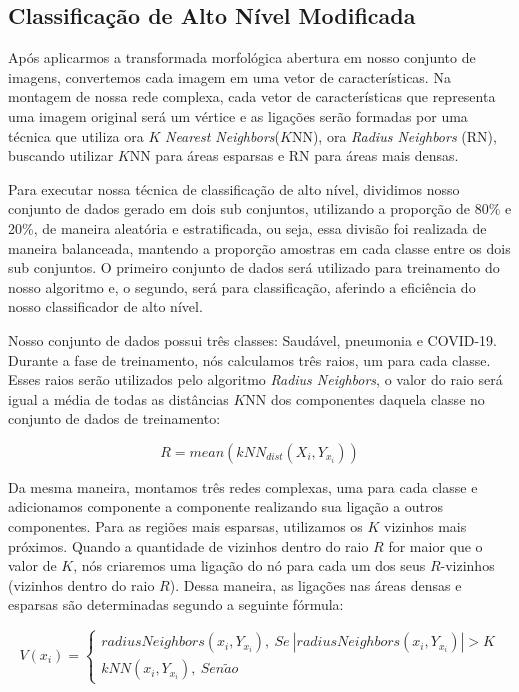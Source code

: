 \documentclass[
12pt,        %
oneside,     %
a4paper,     %
english,       %
brazil        %
%
%
]{ppgca}
\begin{document}
\subsection{Classificação de Alto Nível Modificada}
Após aplicarmos a transformada morfológica abertura em nosso conjunto de imagens, convertemos cada imagem em uma vetor de características. Na montagem de nossa rede complexa, cada vetor de características que representa uma imagem original será um vértice e as ligações serão formadas por uma técnica que utiliza ora $K$ \textit{Nearest Neighbors}($K$NN), ora \textit{Radius Neighbors} (RN), buscando utilizar $K$NN para áreas esparsas e RN para áreas mais densas.

Para executar nossa técnica de classificação de alto nível, dividimos nosso conjunto de dados gerado em dois sub conjuntos, utilizando a proporção de 80\% e 20\%, de maneira aleatória e estratificada, ou seja, essa divisão foi realizada de maneira balanceada, mantendo a proporção amostras em cada classe entre os dois sub conjuntos. O primeiro conjunto de dados será utilizado para treinamento do nosso algoritmo e, o segundo, será para classificação, aferindo a eficiência do nosso classificador de alto nível.

Nosso conjunto de dados possui três classes: Saudável, pneumonia e COVID-19. Durante a fase de treinamento, nós calculamos três raios, um para cada classe. Esses raios serão utilizados pelo algoritmo \textit{Radius Neighbors}, o valor do raio será igual a média de todas as distâncias $K$NN dos componentes daquela classe no conjunto de dados de treinamento:

\begin{equation}
{R}={mean}(kNN_{dist}(X_{i},Y_{x_{i}}))
\end{equation}

Da mesma maneira, montamos três redes complexas, uma para cada classe e adicionamos componente a componente realizando sua ligação a outros componentes. Para as regiões mais esparsas, utilizamos os $K$ vizinhos mais próximos. Quando a quantidade de vizinhos dentro do raio $R$ for maior que o valor de $K$, nós criaremos uma ligação do nó para cada um dos seus $R$-vizinhos (vizinhos dentro do raio $R$). Dessa maneira, as ligações nas áreas densas e esparsas são determinadas segundo a seguinte fórmula:

\begin{equation}
    {V(x_{i})} = \begin{cases}{radiusNeighbors}(x_{i}, Y_{x_{i}}), {\ Se\ } | {radiusNeighbors}(x_{i}, Y_{x_{i}})| > K \\ {kNN} (x_{i}, Y_{x_{i}}), {\ Sen\tilde{a}o}\end{cases}
\end{equation}
\end{document}
